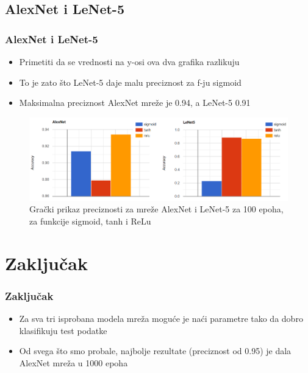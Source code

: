 \documentclass{beamer}
\begin{document}
\subsection{AlexNet i LeNet-5}
\begin{frame}
\frametitle{AlexNet i LeNet-5}

\begin{itemize}
\item Primetiti da se vrednosti na y-osi ova dva grafika razlikuju
\item To je zato što LeNet-5 daje malu preciznost za f-ju sigmoid
\item Maksimalna preciznost AlexNet mreže je 0.94, a LeNet-5 0.91

\end{itemize}

\begin{figure}
\includegraphics[scale=0.45]{graphs_alexnet_lenet.png}
\caption{Grački prikaz preciznosti za mreže AlexNet i LeNet-5 za 100 epoha, za funkcije sigmoid, tanh i ReLu}
\end{figure}

\end{frame}








\section{Zaključak}

\begin{frame}
\frametitle{Zaključak}

\begin{itemize}
\item Za sva tri isprobana modela mreža moguće je naći parametre tako da dobro klasifikuju test podatke 
\item Od svega što smo probale, najbolje rezultate (preciznost od 0.95) je dala AlexNet mreža u 1000 epoha
\end{itemize}

\end{frame}
\end{document}
